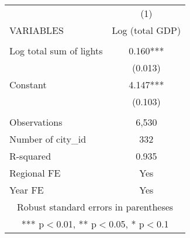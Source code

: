 \documentclass[]{article}
\begin{document}
\begin{tabular}{lc} \hline
 & (1) \\
VARIABLES & Log (total GDP) \\ \hline
 &  \\
Log total sum of lights & 0.160*** \\
 & (0.013) \\
Constant & 4.147*** \\
 & (0.103) \\
 &  \\
Observations & 6,530 \\
Number of city\_id & 332 \\
R-squared & 0.935 \\
Regional FE & Yes \\
 Year FE & Yes \\ \hline
\multicolumn{2}{c}{ Robust standard errors in parentheses} \\
\multicolumn{2}{c}{ *** p$<$0.01, ** p$<$0.05, * p$<$0.1} \\
\end{tabular}
\end{document}
